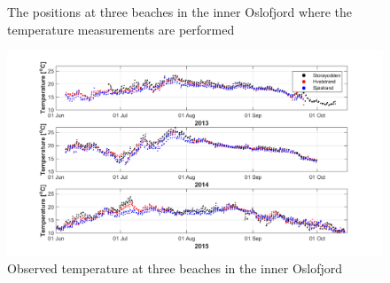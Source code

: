 \documentclass[12pt,a4paper,english]{article}
\begin{document}
\begin{figure}[ht]
{\begin{minipage}[r]{0.4\textwidth}
 \\
 \\
\end{minipage}
}
\caption{\small
The positions at three beaches in the inner Oslofjord where the temperature measurements are performed}
\label{fig:kart_strand}
\end{figure}

\begin{figure}[ht]
\centerline{
\includegraphics*[trim=1cm 0 1cm 0cm,clip=true,width=\textwidth]{Figurer/badetemp}
}
\caption{\small
Observed temperature at three beaches in the inner Oslofjord}
\label{fig:temp_strand}
\end{figure}
\end{document}
